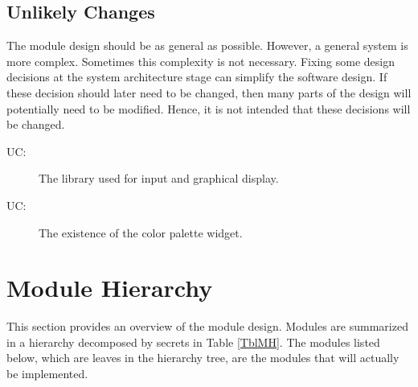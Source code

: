 \documentclass[12pt, titlepage]{article}
\newcounter{ucnum}
\newcommand{\uctheucnum}{UC\theucnum}
\begin{document}
\subsection{Unlikely Changes} \label{SecUchange}

The module design should be as general as possible. However, a general system is
more complex. Sometimes this complexity is not necessary. Fixing some design
decisions at the system architecture stage can simplify the software design. If
these decision should later need to be changed, then many parts of the design
will potentially need to be modified. Hence, it is not intended that these
decisions will be changed.

\begin{description}
\item[ \uctheucnum \label{ucIO}:] The library used for input and graphical display.
\item[ \uctheucnum \label{ucPalette}:] The existence of the color palette widget.
\end{description}

\section{Module Hierarchy} \label{SecMH}


This section provides an overview of the module design. Modules are summarized
in a hierarchy decomposed by secrets in Table \ref{TblMH}. The modules listed
below, which are leaves in the hierarchy tree, are the modules that will
actually be implemented.
\end{document}

